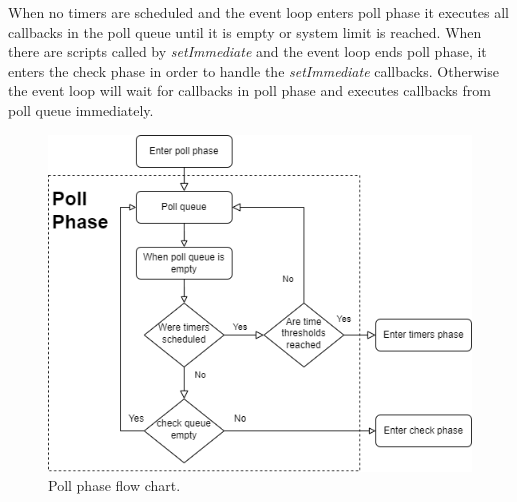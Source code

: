 When no timers are scheduled and the event loop enters poll phase it executes all callbacks in the poll queue until it is empty or system limit is reached.
When there are scripts called by \textit{setImmediate} and the event loop ends poll phase, it enters the check phase in order to handle the \textit{setImmediate} callbacks.
Otherwise the event loop will wait for callbacks in poll phase and executes callbacks from poll queue immediately.
\begin{figure}[htbp]
    \includegraphics[scale=0.8]{images/poll_phase_flow_chart.png}
    \caption{Poll phase flow chart.}
    \label{figure:nodejs:pollPhase}
\end{figure}